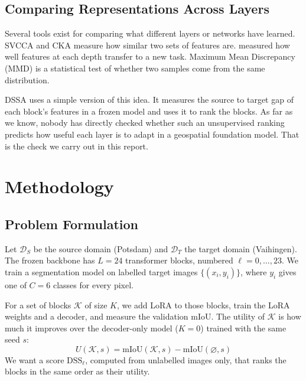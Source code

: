 \documentclass[11pt,a4paper]{report}
\begin{document}
\section{Comparing Representations Across Layers}

Several tools exist for comparing what different layers or networks have learned. SVCCA \cite{raghu2017svcca} and CKA \cite{kornblith2019similarity} measure how similar two sets of features are. \citet{yosinski2014transferable} measured how well features at each depth transfer to a new task. Maximum Mean Discrepancy (MMD) \cite{gretton2012kernel} is a statistical test of whether two samples come from the same distribution.

DSSA uses a simple version of this idea. It measures the source to target gap of each block's features in a frozen model and uses it to rank the blocks. As far as we know, nobody has directly checked whether such an unsupervised ranking predicts how useful each layer is to adapt in a geospatial foundation model. That is the check we carry out in this report.

\chapter{Methodology}
\label{ch:method}

\section{Problem Formulation}

Let $\mathcal{D}_S$ be the source domain (Potsdam) and $\mathcal{D}_T$ the target domain (Vaihingen). The frozen backbone has $L = 24$ transformer blocks, numbered $\ell = 0, \dots, 23$. We train a segmentation model on labelled target images $\{(x_i, y_i)\}$, where $y_i$ gives one of $C = 6$ classes for every pixel.

For a set of blocks $\mathcal{K}$ of size $K$, we add LoRA to those blocks, train the LoRA weights and a decoder, and measure the validation mIoU. The utility of $\mathcal{K}$ is how much it improves over the decoder-only model ($K = 0$) trained with the same seed $s$:
\begin{equation}
    U(\mathcal{K}, s) = \text{mIoU}(\mathcal{K}, s) - \text{mIoU}(\varnothing, s)
\end{equation}
We want a score $\text{DSS}_\ell$, computed from unlabelled images only, that ranks the blocks in the same order as their utility.
\end{document}
